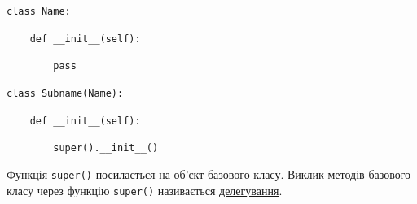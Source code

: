 \begin{frame}

\texttt{class Name:}

\texttt{~~~~def \_\_init\_\_(self):}

\texttt{~~~~~~~~pass}

\texttt{class Subname(Name):}

\texttt{~~~~def \_\_init\_\_(self):}

\texttt{~~~~~~~~super().\_\_init\_\_()}
 
Функція \texttt{super()} посилається на об'єкт базового класу. Виклик методів базового класу через функцію \texttt{super()}  називається \underline{делегування}.
\end{frame}
